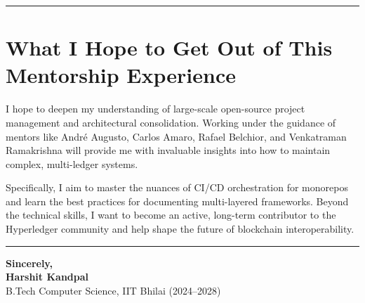 \begin{center}
    \textcolor{secondary}{\rule{0.7\textwidth}{0.3pt}}
\end{center}

\section*{What I Hope to Get Out of This Mentorship Experience}

I hope to deepen my understanding of large-scale open-source project management and architectural consolidation. Working under the guidance of mentors like André Augusto, Carlos Amaro, Rafael Belchior, and Venkatraman Ramakrishna will provide me with invaluable insights into how to maintain complex, multi-ledger systems.

Specifically, I aim to master the nuances of CI/CD orchestration for monorepos and learn the best practices for documenting multi-layered frameworks. Beyond the technical skills, I want to become an active, long-term contributor to the Hyperledger community and help shape the future of blockchain interoperability.

\begin{center}
    \textcolor{secondary}{\rule{0.7\textwidth}{0.3pt}}
\end{center}

\vspace{0.5cm}

\begin{flushleft}
    \textbf{\color{primary}Sincerely,} \\
    \vspace{0.2cm}
    {\color{primary}\Large \textbf{Harshit Kandpal}} \\
    \vspace{0.1cm}
    {\color{secondary}B.Tech Computer Science, IIT Bhilai (2024–2028)}
\end{flushleft}
